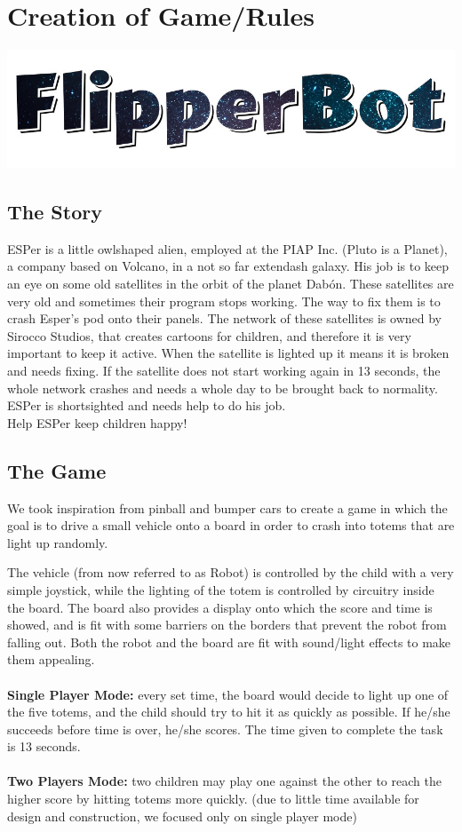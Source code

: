 \documentclass[a4paper,twoside]{book}
\begin{document}
\section{Creation of Game/Rules}

\includegraphics[width=\textwidth]{img/logo}
\subsection{The Story}

ESPer is a little owl\textendash shaped alien, employed at the PIAP Inc. (Pluto is a Planet), a company based on Volcano, in a not so far	extendash galaxy. His job is to keep an eye on some old satellites in the orbit of the planet Dab\'{o}n. These satellites are very old and sometimes their program stops working. The way to fix them is to crash Esper's pod onto their panels. The network of these satellites is owned by Sirocco Studios, that creates cartoons for children, and therefore it is very important to keep it active. When the satellite is lighted up it means it is broken and needs fixing. If the satellite does not start working again in 13 seconds, the whole network crashes and needs a whole day to be brought back to normality. ESPer is short\textendash sighted and needs help to do his job.
\\
Help ESPer keep children happy!

\subsection{The Game}
We took inspiration from pinball and bumper cars to create a game in which the goal is to drive a small vehicle onto a board in order to crash into totems that are light up randomly.

The vehicle (from now referred to as Robot) is controlled by the child with a very simple joystick, while the lighting of the totem is controlled by circuitry inside the board. The board also provides a display onto which the score and time is showed, and is fit with some barriers on the borders that prevent the robot from falling out. Both the robot and the board are fit with sound/light effects to make them appealing.
\\
\\
\textbf{Single Player Mode:} every set time, the board would decide to light up one of the five totems, and the child should try to hit it as quickly as possible. If he/she succeeds before time is over, he/she scores. The time given to complete the task is 13 seconds.
\\
\\
\textbf{Two Players Mode:} two children may play one against the other to reach the higher score by hitting totems more quickly.
(due to little time available for  design and construction, we focused only on single player mode)
\end{document}
